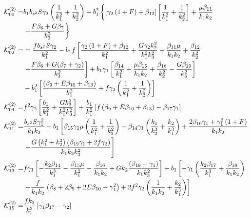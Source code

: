 \begin{align*}
\ko_{00}^{(2)}=& b_1 b_{s^2} S \gamma_2 \left( \frac{1}{k_1^2} + \frac{1}{k_2^2} \right) + b_1^2 \left\{ \left[ \gamma_2 \left( 1 + F \right) + \beta_{12}\right] \left[\frac{1}{k_1^2} + \frac{1}{k_2^2} \right] + \frac{\mu \beta_{11}}{k_1 k_2} \right. \nonumber \\
&\left. + \frac{F \beta_{6} + G \beta_{7} }{k_3^2}\right\}\\
%
\ko_{02}^{(2)}=& =\frac{f b_{s^2} S \gamma_2}{k_1^2} - b_1 f \left[  \frac{\gamma_2 \left( 1+F  \right) + \beta_{12}}{k_1^2} + \frac{G \gamma_2 k_2^2 }{k_1^2 k_3^2} + \frac{\beta_{11} \mu}{k_1 k_2} + \frac{\beta_{12}}{k_2^2} \right. \\
&\left. + \frac{F \beta_{6} + G (\beta_{7} + \gamma_2)}{k_3^2} \right] + b_1 \gamma_1 \left[ \frac{\beta_{14} }{k_1^2} + \frac{\mu \beta_{15} }{k_1 k_2} + \frac{\beta_{16}}{k_2^2} - \frac{G \beta_{19}}{k_3^2}\right] \\
&- b_1^2 \left[ \frac{\left(\beta_{9} + E \beta_{10} + \beta_{13}\right)}{k_1^2} + f \gamma_2 \left(\frac{1}{k_1^2} + \frac{1}{k_2^2} \right) \right] \\
\ko_{04}^{(2)}=& f^2 \gamma_2 \left[ \frac{b_1}{k_1^2} + \frac{G k_2^2}{k_1^2 k_3^2} \right] + \frac{b_1}{k_1^2} \left[ f \left( \beta_{9} + E \beta_{10} + \beta_{13} \right) - \beta_{17} \gamma_1 \right]\\
\ko_{11}^{(2)}=& \frac{b_{s^2} S \gamma_1^2}{k_1 k_2} + b_1 \left[ \beta_{15} \gamma_1 \mu \left(\frac{1}{k_1^2} + \frac{1}{k_2^2} \right) + \beta_{14} \gamma_1 \left( \frac{k_1}{k_2^3} + \frac{k_2}{k_1^3} \right) + \frac{2 \beta_{16} \gamma_1 + \gamma_1^2\left(1+F\right)}{k_1 k_2} \right.\\
&\left.- \frac{G \left(k_1^2 + k_2^2\right) \left(\beta_{19} \gamma_1  + 2 f \gamma_2\right)}{k_1 k_2 k_3^2} \right]\\
\ko_{13}^{(2)} =& f \gamma_1 \left[ - \frac{k_2 \beta_{14}}{k_1^3} - \frac{\beta_{15} \mu}{k_1^2} - \frac{\beta_{16}}{k_1 k_2} + G k_2 \frac{\left(\beta_{19} - \gamma_1\right)}{k_1 k_3^2}  \right] + b_1 \left[ -\gamma_1 \left( \frac{k_2 \beta_{17}}{k_1^3} + \frac{\beta_{18}}{k_1 k_2}\right) \right.  \\
&\left. + \frac{f}{k_1 k_2} \left(  \beta_{8} + 2 \beta_{9} + 2 E \beta_{10} - \gamma_1^2 \right) + 2 f^2 \gamma_2 \left( \frac{1}{k_1 k_2 }  + \frac{k_2}{k_1^3 }\right)\right] \\
\ko_{15}^{(2)}=& \frac{f k_2}{k_1^3} \left[ \gamma_1 \beta_{17} - \gamma_2 \right] \\

\end{align*}
